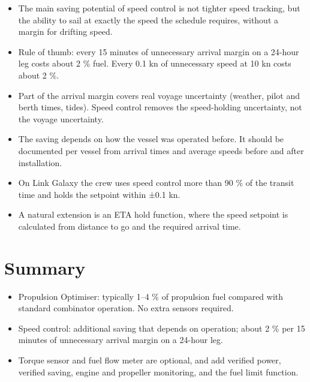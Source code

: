 \documentclass[a4paper,11pt]{article}
\begin{document}
\begin{itemize}
\item The main saving potential of speed control is not tighter speed
tracking, but the ability to sail at exactly the speed the schedule
requires, without a margin for drifting speed.
\item Rule of thumb: every 15 minutes of unnecessary arrival margin on a
24-hour leg costs about 2 \% fuel.  Every 0.1 kn of unnecessary speed
at 10 kn costs about 2 \%.
\item Part of the arrival margin covers real voyage uncertainty (weather,
pilot and berth times, tides).  Speed control removes the
speed-holding uncertainty, not the voyage uncertainty.
\item The saving depends on how the vessel was operated before.  It should
be documented per vessel from arrival times and average speeds before
and after installation.
\item On Link Galaxy the crew uses speed control more than 90 \% of the
transit time and holds the setpoint within ±0.1 kn.
\item A natural extension is an ETA hold function, where the speed setpoint
is calculated from distance to go and the required arrival time.
\end{itemize}

\section{Summary}
\label{sec:orgf3310d4}

\begin{itemize}
\item Propulsion Optimiser: typically 1--4 \% of propulsion fuel compared with
standard combinator operation.  No extra sensors required.
\item Speed control: additional saving that depends on operation; about 2 \%
per 15 minutes of unnecessary arrival margin on a 24-hour leg.
\item Torque sensor and fuel flow meter are optional, and add verified power,
verified saving, engine and propeller monitoring, and the fuel limit
function.
\end{itemize}
\end{document}
